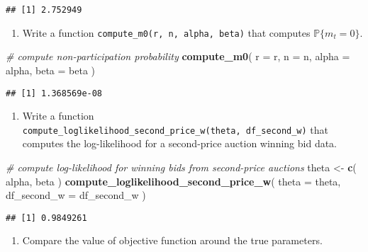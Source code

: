 \documentclass[
]{book}
\newenvironment{Shaded}{\begin{snugshade}}{\end{snugshade}}
\newcommand{\AttributeTok}[1]{\textcolor[rgb]{0.13,0.29,0.53}{#1}}
\newcommand{\CommentTok}[1]{\textcolor[rgb]{0.56,0.35,0.01}{\textit{#1}}}
\newcommand{\FunctionTok}[1]{\textcolor[rgb]{0.13,0.29,0.53}{\textbf{#1}}}
\newcommand{\NormalTok}[1]{#1}
\newcommand{\OtherTok}[1]{\textcolor[rgb]{0.56,0.35,0.01}{#1}}
\providecommand{\tightlist}{%
  \setlength{\itemsep}{0pt}\setlength{\parskip}{0pt}}
\begin{document}
\begin{verbatim}
## [1] 2.752949
\end{verbatim}

\begin{enumerate}
\def\labelenumi{\arabic{enumi}.}
\setcounter{enumi}{1}
\tightlist
\item
  Write a function \texttt{compute\_m0(r,\ n,\ alpha,\ beta)} that computes \(\mathbb{P}\{m_t = 0\}\).
\end{enumerate}

\begin{Shaded}
\begin{Highlighting}[]
\CommentTok{\# compute non{-}participation probability}
\FunctionTok{compute\_m0}\NormalTok{(}
  \AttributeTok{r =}\NormalTok{ r, }
  \AttributeTok{n =}\NormalTok{ n, }
  \AttributeTok{alpha =}\NormalTok{ alpha, }
  \AttributeTok{beta =}\NormalTok{ beta}
\NormalTok{  )}
\end{Highlighting}
\end{Shaded}

\begin{verbatim}
## [1] 1.368569e-08
\end{verbatim}

\begin{enumerate}
\def\labelenumi{\arabic{enumi}.}
\setcounter{enumi}{1}
\tightlist
\item
  Write a function \texttt{compute\_loglikelihood\_second\_price\_w(theta,\ df\_second\_w)} that computes the log-likelihood for a second-price auction winning bid data.
\end{enumerate}

\begin{Shaded}
\begin{Highlighting}[]
\CommentTok{\# compute log{-}likelihood for winning bids from second{-}price auctions}
\NormalTok{theta }\OtherTok{\textless{}{-}} 
  \FunctionTok{c}\NormalTok{(}
\NormalTok{    alpha, }
\NormalTok{    beta}
\NormalTok{    )}
\FunctionTok{compute\_loglikelihood\_second\_price\_w}\NormalTok{(}
  \AttributeTok{theta =}\NormalTok{ theta, }
  \AttributeTok{df\_second\_w =}\NormalTok{ df\_second\_w}
\NormalTok{  )}
\end{Highlighting}
\end{Shaded}

\begin{verbatim}
## [1] 0.9849261
\end{verbatim}

\begin{enumerate}
\def\labelenumi{\arabic{enumi}.}
\setcounter{enumi}{2}
\tightlist
\item
  Compare the value of objective function around the true parameters.
\end{enumerate}
\end{document}
